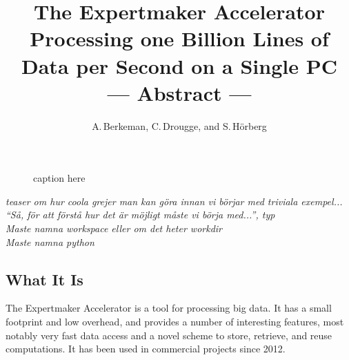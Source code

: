 \documentclass[a4paper]{article}
\title{The Expertmaker Accelerator\\[1ex]\large{Processing one Billion Lines of Data per Second on a
  Single PC}\\\Large{--- Abstract ---}}
\author{A.\,Berkeman, C.\,Drougge, and S.\,H\"orberg}
\date{}
\begin{document}
\maketitle
\thispagestyle{empty}

\begin{figure}[h]
  \begin{center}
    \caption{caption here}
    \label{figure:example}
  \end{center}
\end{figure}







            

\emph{
 teaser om hur coola grejer man kan göra innan vi börjar med triviala
 exempel...  ``Så, för att förstå hur det är möjligt måste vi börja
 med...'', typ
}\\

\emph{Maste namna workspace eller om det heter workdir}\\

\emph{Maste namna python}\\


\subsection*{What It Is}
The Expertmaker Accelerator is a tool for processing big data.  It has
a small footprint and low overhead, and provides a number of
interesting features, most notably very fast data access and a novel
scheme to store, retrieve, and reuse computations.  It has been used
in commercial projects since 2012.
\end{document}
